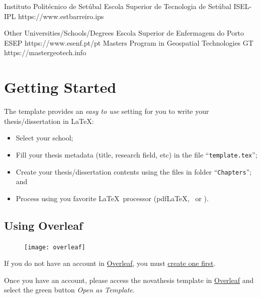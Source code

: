 \begin{ntUniversity}{Instituto Politécnico de Setúbal}
             {Escola Superior de Tecnologia de Setúbal}%
             {ISEL-IPL}%
             {https://www.estbarreiro.ips}%
\end{ntUniversity}

\begin{ntUniversity}{Other Universities/Schools/Degrees}
             {Escola Superior de Enfermagem do Porto}%
             {ESEP}%
             {https://www.esenf.pt/pt}%
             {Masters Program in Geospatial Technologies}%
             {GT}%
             {https://mastergeotech.info}%
\end{ntUniversity}


\section{Getting Started}
\label{sec:getting_started}

The template provides an \emph{easy to use} setting for you to write your thesis/dissertation in \LaTeX:
\begin{itemize}
  \item  Select your school;
  \item Fill your thesis metadata (title, research field, etc) in the file “\texttt{template.tex}”;
  \item Create your thesis/dissertation contents using the files in folder “\texttt{Chapters}”; and
  \item Process using you favorite \LaTeX\ processor (pdf\LaTeX, \XeLaTeX\ or \LuaLaTeX).
\end{itemize}

\subsection{Using Overleaf}
\label{sub:using_overleaf}

\begin{figure}
\vspace*{-15ex}\texttt{[image: overleaf]}%
\end{figure}

If you do not have an account in \href{https://www.overleaf.com?r=f5160636&rm=d&rs=b}{Overleaf}, you must \href{https://www.overleaf.com?r=f5160636&rm=d&rs=b}{create one first}.

Once you have an account, please access the \gls{novathesis} template in \href{https://www.overleaf.com/latex/templates/new-university-of-lisbon-universidade-nova-de-lisboa-slash-unl-thesis-template/fwbztcrptjmg}{Overleaf} and select the green button \emph{Open as Template}. 

